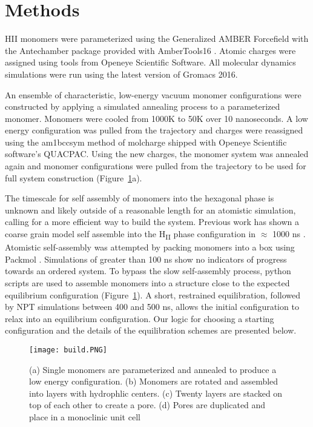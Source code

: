 \section*{Methods}
	
HII monomers were parameterized using the Generalized AMBER Forcefield
\cite{wang_development_2004} with the Antechamber package \cite{wang_automatic_2006}
provided with AmberTools16 \cite{case_ambertools16_2016}. Atomic charges were
assigned using tools from Openeye Scientific Software. All molecular 
dynamics simulations were run using the latest version of Gromacs 2016. \cite{bekker_gromacs:_1993,berendsen_gromacs:_1995,
van_der_spoel_gromacs:_2005,hess_gromacs_2008}
	
An ensemble of characteristic, low-energy vacuum monomer configurations
were constructed by applying a simulated annealing process to a
parameterized monomer. Monomers were cooled from 1000K to 50K over 10
nanoseconds. A low energy configuration was pulled from the trajectory 
and charges were reassigned using the am1bccsym method of molcharge
shipped with Openeye Scientific software's QUACPAC. Using the new
charges, the monomer system was annealed again and monomer
configurations were pulled from the trajectory to be used for full
system construction (Figure~\ref{fig:python}a).
	
The timescale for self assembly of monomers into the hexagonal phase is
unknown and likely outside of a reasonable length for an atomistic
simulation, calling for a more efficient way to build the system. 
Previous work has shown a coarse grain model self assemble into the H\textsubscript{II}
phase configuration in $\approx$ 1000 ns \cite{mondal_self-assembly_2013}.
Atomistic self-assembly was attempted by packing monomers into a box 
using Packmol \cite{martinez_packmol:_2009}. Simulations of greater than 100 ns 
show no indicators of progress towards an ordered system. To bypass the
slow self-assembly process, python scripts are used to assemble 
monomers into a structure close to the expected equilibrium configuration (Figure~\ref{fig:python}).
A short, restrained equilibration, followed by NPT simulations between 400 and 500 ns, 
allows the initial configuration to relax into an equilibrium configuration.
Our logic for choosing a starting configuration and the details of the equilibration 
schemes are presented below. %

\begin{figure}[H]
	\centering
	\texttt{[image: build.PNG]}
	\caption{(a) Single monomers are parameterized and annealed to produce a low energy
		configuration. (b) Monomers are rotated and assembled into layers with 
		hydrophlic centers. (c) Twenty layers are stacked on top of each other to create
		a pore. (d) Pores are duplicated and place in a monoclinic unit cell}\label{fig:python}
\end{figure}

